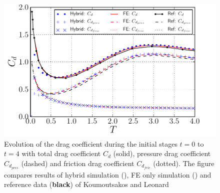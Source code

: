 	\begin{figure}[!p]
	\centering
	\includegraphics[width=0.6\linewidth]{./figures/validation/isc/hybrid_ISC_drag_base.pdf}
	\caption{ Evolution of the drag coefficient during the initial stages $t=0$ to $t=4$ with total drag coefficient $C_d$ (solid), pressure drag coefficient $C_{d_{pres}}$ (dashed) and friction drag coefficient $C_{d_{fric}}$ (dotted). The figure compares results of hybrid simulation ({}), FE only simulation ({}) and reference data (\textbf{black}) of Koumoutsakos and Leonard \cite{Koumoutsakos1995a}}
	\label{fig:hybrid_ISC_drag}
	\end{figure}

